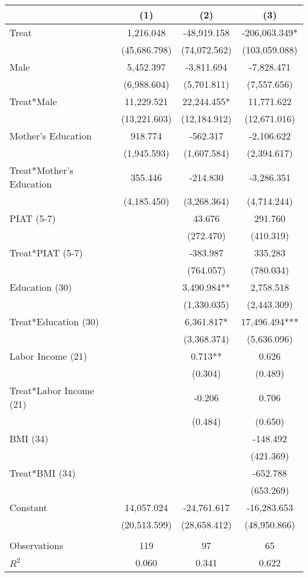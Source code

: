 \begin{tabular}{lccc} \toprule
 & (1) & (2) & (3) \\ \midrule
Treat & 1,216.048 & -48,919.158 & -206,063.349* \\
 & (45,686.798) & (74,072.562) & (103,059.088) \\
 Male  & 5,452.397 & -3,811.694 & -7,828.471 \\
 & (6,988.604) & (5,701.811) & (7,557.656) \\
Treat*Male & 11,229.521 & 22,244.455* & 11,771.622 \\
 & (13,221.603) & (12,184.912) & (12,671.016) \\
Mother's Education  & 918.774 & -562.317 & -2,106.622 \\
 & (1,945.593) & (1,607.584) & (2,394.617) \\
Treat*Mother's Education & 355.446 & -214.830 & -3,286.351 \\
 & (4,185.450) & (3,268.364) & (4,714.244) \\
PIAT (5-7) &  & 43.676 & 291.760 \\
 &  & (272.470) & (410.319) \\
Treat*PIAT (5-7) &  & -383.987 & 335.283 \\
 &  & (764.057) & (780.034) \\
Education (30) &  & 3,490.984** & 2,758.518 \\
 &  & (1,330.035) & (2,443.309) \\
Treat*Education (30) &  & 6,361.817* & 17,496.494*** \\
 &  & (3,368.374) & (5,636.096) \\
Labor Income (21) &  & 0.713** & 0.626 \\
 &  & (0.304) & (0.489) \\
Treat*Labor Income (21) &  & -0.206 & 0.706 \\
 &  & (0.484) & (0.650) \\
BMI (34) &  &  & -148.492 \\
 &  &  & (421.369) \\
Treat*BMI (34) &  &  & -652.788 \\
 &  &  & (653.269) \\
Constant & 14,057.024 & -24,761.617 & -16,283.653 \\
 & (20,513.599) & (28,658.412) & (48,950.866) \\ \\ \midrule
Observations & 119 & 97 & 65 \\
$R^2$ & 0.060 & 0.341 & 0.622 \\ \bottomrule
\end{tabular}
